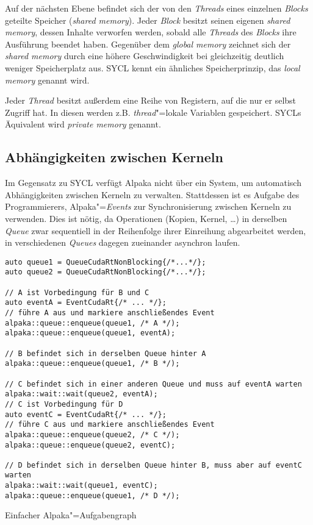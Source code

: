 Auf der nächsten Ebene befindet sich der von den \textit{Threads} eines
einzelnen \textit{Blocks} geteilte Speicher (\textit{shared memory}). Jeder
\textit{Block} besitzt seinen eigenen \textit{shared memory}, dessen Inhalte
verworfen werden, sobald alle \textit{Threads} des \textit{Blocks} ihre
Ausführung beendet haben. Gegenüber dem \textit{global memory} zeichnet sich der
\textit{shared memory} durch eine höhere Geschwindigkeit bei gleichzeitig
deutlich weniger Speicherplatz aus. SYCL kennt ein ähnliches Speicherprinzip,
das \textit{local memory} genannt wird.

Jeder \textit{Thread} besitzt außerdem eine Reihe von Registern, auf die nur er
selbst Zugriff hat. In diesen werden z.B. \textit{thread}"=lokale Variablen
gespeichert. SYCLs Äquivalent wird \textit{private memory} genannt.

\subsection{Abhängigkeiten zwischen Kerneln}
\label{alpaka:konzepte:abhaengigkeiten}

Im Gegensatz zu SYCL verfügt Alpaka nicht über ein System, um automatisch
Abhängigkeiten zwischen Kerneln zu verwalten. Stattdessen ist es Aufgabe des
Programmierers, Alpaka"=\textit{Events} zur Synchronisierung zwischen Kerneln zu
verwenden. Dies ist nötig, da Operationen (Kopien, Kernel, \ldots) in derselben
\textit{Queue} zwar sequentiell in der Reihenfolge ihrer Einreihung
abgearbeitet werden, in verschiedenen \textit{Queues} dagegen zueinander
asynchron laufen.

\begin{code}
    \begin{verbatim}
auto queue1 = QueueCudaRtNonBlocking{/*...*/};
auto queue2 = QueueCudaRtNonBlocking{/*...*/};

// A ist Vorbedingung für B und C
auto eventA = EventCudaRt{/* ... */};
// führe A aus und markiere anschließendes Event
alpaka::queue::enqueue(queue1, /* A */);
alpaka::queue::enqueue(queue1, eventA);

// B befindet sich in derselben Queue hinter A
alpaka::queue::enqueue(queue1, /* B */);

// C befindet sich in einer anderen Queue und muss auf eventA warten
alpaka::wait::wait(queue2, eventA);
// C ist Vorbedingung für D
auto eventC = EventCudaRt{/* ... */};
// führe C aus und markiere anschließendes Event
alpaka::queue::enqueue(queue2, /* C */);
alpaka::queue::enqueue(queue2, eventC);

// D befindet sich in derselben Queue hinter B, muss aber auf eventC warten
alpaka::wait::wait(queue1, eventC);
alpaka::queue::enqueue(queue1, /* D */);
    \end{verbatim}
    \caption{Einfacher Alpaka"=Aufgabengraph}
    \label{alpaka:konzepte:abhaengigkeiten:src}
\end{code}

